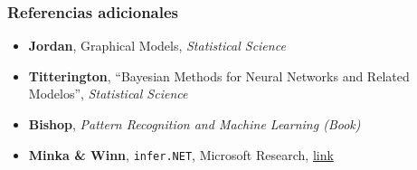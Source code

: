 \documentclass[11pt,]{article}
\begin{document}
\subsubsection{Referencias adicionales}\label{referencias-adicionales}

\begin{itemize}
\item
  \textbf{Jordan}, Graphical Models, \emph{Statistical Science}
\item
  \textbf{Titterington}, ``Bayesian Methods for Neural Networks and
  Related Modelos'', \emph{Statistical Science}
\item
  \textbf{Bishop}, \emph{Pattern Recognition and Machine Learning
  (Book)}
\item
  \textbf{Minka \& Winn}, \texttt{infer.NET}, Microsoft Research,
  \href{http://infernet.azurewebsites.net/}{link}
\end{itemize}




\newpage
\singlespacing 
\end{document}
